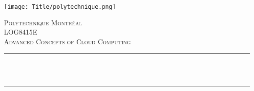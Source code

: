 \begin{titlepage}

    \newcommand{\HRule}{\rule{\linewidth}{0.5mm}} %
    
    \center
    \texttt{[image: Title/polytechnique.png]}\\[1cm] %
     
    
    \center %
    
    
    \textsc{\LARGE Polytechnique Montréal }\\[1.5cm] %
    \textsc{\Large LOG8415E}\\[0.5cm] %
    \textsc{\large Advanced Concepts of Cloud Computing}\\[0.5cm] %
    
    \makeatletter
    \HRule \\[0.4cm]
    { \huge \bfseries \@title}\\[0.4cm] %
    \HRule \\[1.5cm]
     
    

\end{titlepage}
